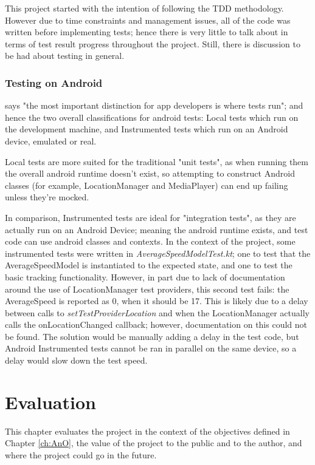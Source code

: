 \documentclass[11pt, a4paper, notitlepage]{report}
\begin{document}
This project started with the intention of following the TDD methodology. However due to time constraints and management issues, all of the code was written before implementing tests; hence there is very little to talk about in terms of test result progress throughout the project. Still, there is discussion to be had about testing in general.

\subsection{Testing on Android}
\citet{testingAndroid} says "the most important distinction for app developers is where tests run"; and hence the two overall classifications for android tests: Local tests which run on the development machine, and Instrumented tests which run on an Android device, emulated or real.

Local tests are more suited for the traditional "unit tests", as when running them the overall android runtime doesn't exist, so attempting to construct Android classes (for example, LocationManager and MediaPlayer) can end up failing unless they're mocked.

In comparison, Instrumented tests are ideal for "integration tests", as they are actually run on an Android Device; meaning the android runtime exists, and test code can use android classes and contexts. In the context of the project, some instrumented tests were written in \textit{AverageSpeedModelTest.kt}; one to test that the AverageSpeedModel is instantiated to the expected state, and one to test the basic tracking functionality. However, in part due to lack of documentation around the use of LocationManager test providers, this second test fails: the AverageSpeed is reported as 0, when it should be 17. This is likely due to a delay between calls to \textit{setTestProviderLocation} and when the LocationManager actually calls the onLocationChanged callback; however, documentation on this could not be found. The solution would be manually adding a delay in the test code, but Android Instrumented tests cannot be ran in parallel on the same device, so a delay would slow down the test speed.

\chapter{Evaluation}
This chapter evaluates the project in the context of the objectives defined in Chapter \ref{ch:AnO}, the value of the project to the public and to the author, and where the project could go in the future.
\end{document}
